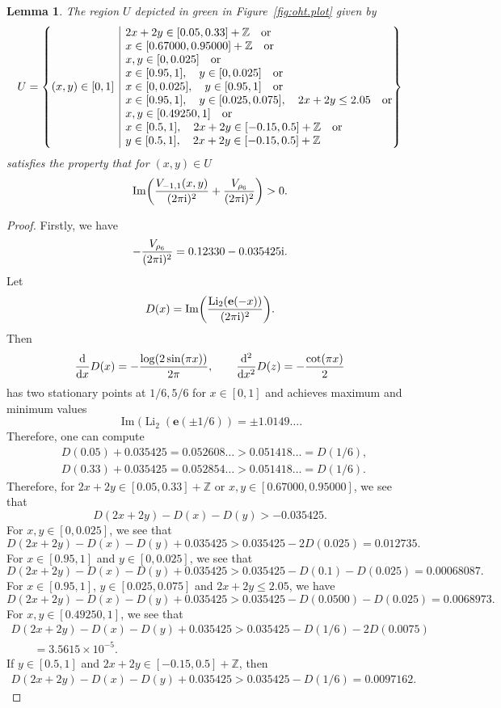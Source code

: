 \documentclass[pdftex]{sigma}
\numberwithin{equation}{section}
\newtheorem{Lemma}[Theorem]{Lemma}
\def\BZ{\mathbb{Z}}
\def\Li{\mathrm{Li}}
\def\e{\mathbf e}
\def\BZ{\mathbb Z}
\def\Li{\operatorname{Li}}
\def\Im{\operatorname{Im}}
\begin{document}
\begin{Lemma}\label{lem:greenregion}
The region $U$ depicted in green in Figure~{\rm \ref{fig:oht.plot}} given by
\[
 U
  =
 \left\{\begin{array}{@{}c|l@{}}
 &2x+2y\in[0.05,0.33]+\BZ\quad \text{or}\\
 &x\in[0.67000,0.95000]+\BZ\quad \text{or}\\
 &x,y\in[0,0.025]\quad \text{or}\\
 &x\in[0.95,1] ,\quad y\in[0,0.025]\quad \text{or}\\
 (x,y)\in[0,1]& x\in[0,0.025] ,\quad y\in[0.95,1]\quad \text{or}\\
 &x\in[0.95,1] ,\quad y\in[0.025,0.075] ,\quad 2x+2y\leq 2.05\quad \text{or}\\
 &x,y\in[0.49250,1]\quad \text{or}\\
 &x\in[0.5,1] ,\quad 2x+2y\in[-0.15,0.5]+\BZ\quad \text{or}\\
 &y\in[0.5,1] ,\quad 2x+2y\in[-0.15,0.5]+\BZ
 \end{array}\right\}
\]
satisfies the property that for $(x,y)\in U$
\[
 \Im\biggl(\frac{V_{-1,1}(x,y)}{(2\pi {\rm i})^2}+\frac{V_{\rho_6}}{(2\pi {\rm i})^2}\biggr)>0 .
\]
\end{Lemma}
\begin{proof}
Firstly, we have
\[
 -\frac{V_{\rho_6}}{(2\pi {\rm i})^2}
  =
 0.12330 - 0.035425{\rm i} .
\]
Let
\[
 D(x)
  =
 \Im\biggl(\frac{\Li_{2}(\e(-x))}{(2\pi {\rm i})^2}\biggr) .
\]
Then
\[
 \frac{{\rm d}}{{\rm d}x}D(x)
  =
 -\frac{\log(2\sin(\pi x))}{2\pi} ,\qquad
 \frac{{\rm d}^2}{{\rm d}x^2}D(z)
  =
 -\frac{\cot(\pi x)}{2}
\]
has two stationary points at $1/6,5/6$ for $x\in[0,1]$ and achieves maximum and minimum values
\[
 \Im(\Li_{2}(\e(\pm1/6))
  =
 \pm1.0149\dots .
\]
Therefore, one can compute
\begin{align*}
& D(0.05)+0.035425
 =0.052608\ldots>0.051418\ldots =D(1/6),\\
& D(0.33)+0.035425
 =0.052854\ldots>0.051418\ldots =D(1/6) .
\end{align*}
Therefore, for $2x+2y\in[0.05,0.33]+\BZ$ or $x,y\in[0.67000,0.95000]$, we see that
\[
 D(2x+2y)-D(x)-D(y)>-0.035425 .
\]
For $x,y\in[0,0.025]$, we see that
\[
 D(2x+2y)-D(x)-D(y)+0.035425
 >
 0.035425-2D(0.025)
  =
 0.012735 .
\]
For $x\in[0.95,1]$ and $y\in[0,0.025]$, we see that
\[
 D(2x+2y)-D(x)-D(y)+0.035425
 >
 0.035425-D(0.1)-D(0.025)
  =
 0.00068087 .
\]
For $x\in[0.95,1]$, $y\in[0.025,0.075]$ and $2x+2y\leq 2.05$, we have
\[
 D(2x+2y)-D(x)-D(y)+0.035425
 >
 0.035425-D(0.0500)-D(0.025)
  =
 0.0068973 .
\]
For $x,y\in[0.49250,1]$, we see that
\begin{gather*}
 D(2x+2y)-D(x)-D(y)+0.035425
 >
 0.035425-D(1/6)-2D(0.0075)
 \\
 \qquad{} =
 3.5615\times 10^{-5} .
\end{gather*}
If $y\in[0.5,1]$ and $2x+2y\in[-0.15,0.5]+\BZ$, then
\begin{gather*}
 D(2x+2y)-D(x)-D(y)+0.035425
 >
 0.035425-D(1/6)
  =
 0.0097162 .\tag*{\qed}
\end{gather*}\renewcommand{\qed}{}
\end{proof}
\end{document}
